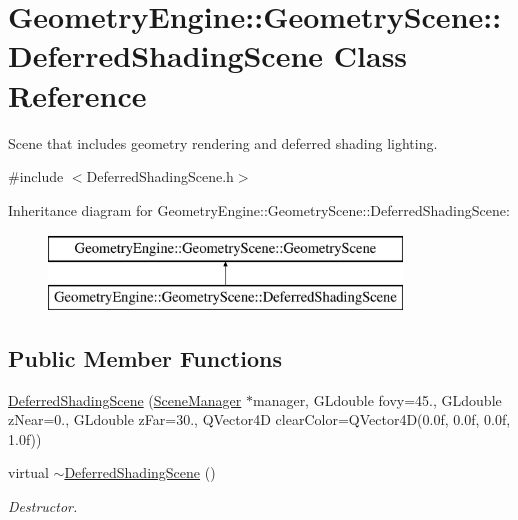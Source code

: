 \hypertarget{class_geometry_engine_1_1_geometry_scene_1_1_deferred_shading_scene}{}\section{Geometry\+Engine\+::Geometry\+Scene\+::Deferred\+Shading\+Scene Class Reference}
\label{class_geometry_engine_1_1_geometry_scene_1_1_deferred_shading_scene}


Scene that includes geometry rendering and deferred shading lighting.  




{\ttfamily \#include $<$Deferred\+Shading\+Scene.\+h$>$}

Inheritance diagram for Geometry\+Engine\+::Geometry\+Scene\+::Deferred\+Shading\+Scene\+:\begin{figure}[H]
\begin{center}
\leavevmode
\includegraphics[height=2.000000cm]{class_geometry_engine_1_1_geometry_scene_1_1_deferred_shading_scene}
\end{center}
\end{figure}
\subsection*{Public Member Functions}
\begin{DoxyCompactItemize}
\item 
\mbox{\hyperlink{class_geometry_engine_1_1_geometry_scene_1_1_deferred_shading_scene_a333dbad12685941c5764f88c37263cac}{Deferred\+Shading\+Scene}} (\mbox{\hyperlink{class_geometry_engine_1_1_scene_manager}{Scene\+Manager}} $\ast$manager, G\+Ldouble fovy=45., G\+Ldouble z\+Near=0., G\+Ldouble z\+Far=30., Q\+Vector4D clear\+Color=Q\+Vector4D(0.\+0f, 0.\+0f, 0.\+0f, 1.\+0f))
\item 
\mbox{\label{class_geometry_engine_1_1_geometry_scene_1_1_deferred_shading_scene_a98b6bc1bdf43eaa32ccd903fb7d4cb52}} 
virtual \mbox{\hyperlink{class_geometry_engine_1_1_geometry_scene_1_1_deferred_shading_scene_a98b6bc1bdf43eaa32ccd903fb7d4cb52}{$\sim$\+Deferred\+Shading\+Scene}} ()
\begin{DoxyCompactList}\small\item\em Destructor. \end{DoxyCompactList}\end{DoxyCompactItemize}
